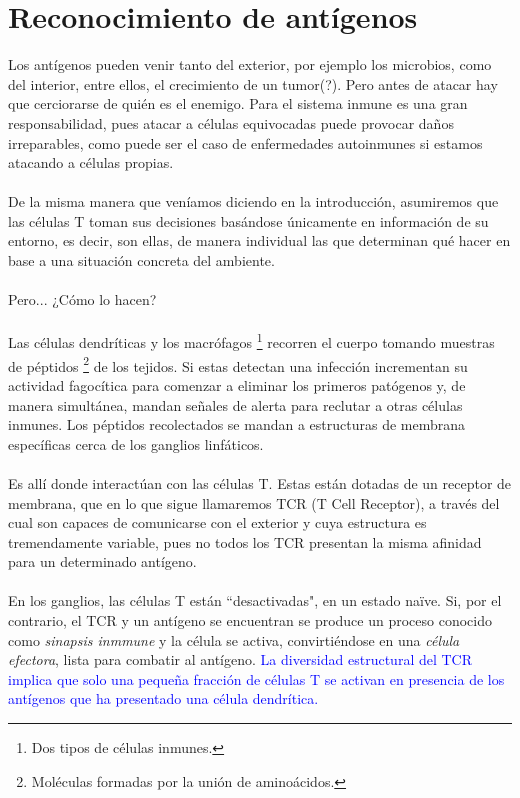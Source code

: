 \documentclass{article}
\begin{document}
	 \section{Reconocimiento de antígenos}
	 Los antígenos pueden venir tanto del exterior, por ejemplo los microbios, como del interior, entre ellos, el crecimiento de un tumor(?). Pero antes de atacar hay que cerciorarse de quién es el enemigo. Para el sistema inmune es una gran responsabilidad, pues atacar a células equivocadas puede provocar daños irreparables, como puede ser el caso de enfermedades autoinmunes si estamos atacando a células propias.
	 \\
	 \\
	 De la misma manera que veníamos diciendo en la introducción, asumiremos que las células T toman sus decisiones basándose únicamente en información de su entorno, es decir, son ellas, de manera individual las que determinan qué hacer en base a una situación concreta del ambiente.
	 \\
 	 \\
 	 Pero... ¿Cómo lo hacen?
 	 \\
 	 \\
 	 Las células dendríticas y los macrófagos \footnote{Dos tipos de células inmunes.} recorren el cuerpo tomando muestras de péptidos \footnote{Moléculas formadas por la unión de aminoácidos.} de los tejidos. Si estas detectan una infección incrementan su actividad fagocítica para comenzar a eliminar los primeros patógenos y, de manera simultánea, mandan señales de alerta para reclutar a otras células inmunes. Los péptidos recolectados se mandan a estructuras de membrana específicas cerca de los ganglios linfáticos.
 	 \\
 	 \\
 	 Es allí donde interactúan con las células T. Estas están dotadas de un receptor de membrana, que en lo que sigue llamaremos TCR (T Cell Receptor), a través del cual son capaces de comunicarse con el exterior y cuya estructura es tremendamente variable, pues no todos los TCR presentan la misma afinidad para un determinado antígeno.
 	 \\
 	 \\
 	 En los ganglios, las células T están ``desactivadas", en un estado naïve. Si, por el contrario, el TCR y un antígeno se encuentran se produce un proceso conocido como \textit{sinapsis inmmune} y la célula se activa, convirtiéndose en una \textit{célula efectora}, lista para combatir al antígeno.
 	 \textcolor{blue}{La diversidad estructural del TCR implica que solo una pequeña fracción de células T se activan en presencia de los antígenos que ha presentado una célula dendrítica.}
\end{document}
